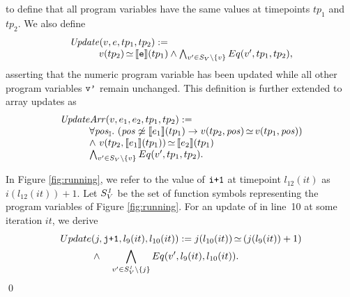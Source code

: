 to define that all program variables have the same values at
timepoints $tp_1$ and $tp_2$. We also define
%
\begin{equation*}
\begin{array}{l}
\mathit{Update}(v,e,tp_1,tp_2) := \\
\qquad\quad	 v(tp_2) {\,\simeq\,} \llbracket \texttt{e} \rrbracket(tp_1) 
\land \bigwedge_{v' \in S_V \setminus \{v\}} Eq(v',tp_1,tp_2), 
\end{array}
\end{equation*}
asserting that the numeric program variable  has been updated while
all other program variables $\texttt{v'}$ remain unchanged. This definition is
further 
extended  to array updates as
\begin{equation*}
\begin{array}{l}
\mathit{Update}\mathit{Arr}(v,e_1,e_2,tp_1,tp_2) :=\\
\qquad\quad \forall \mathit{pos}_{\mathbb{I}}. \ (\mathit{pos} \not\simeq \llbracket e_1\rrbracket(tp_1) \rightarrow 
v(tp_2, \mathit{pos}) {\,\simeq\,} v(tp_1, \mathit{pos}))
\\
\qquad\quad \land \ v(tp_2, \llbracket e_1 \rrbracket(tp_1)) {\,\simeq\,} \llbracket e_2 \rrbracket(tp_1) 	\\
\qquad\quad  \bigwedge_{v' \in S_V \setminus \{v\}} Eq(v',tp_1,tp_2). 	\nonumber 
\end{array}
\end{equation*}

\begin{example}
	In Figure \ref{fig:running}, we refer to the value of $\texttt{i+1}$ at timepoint $l_{12}(it)$ as
	$i(l_{12}(it))+1$. 
	Let $S_V^\textit{1}$ be the set of function symbols
	representing the program variables of Figure \ref{fig:running}.
	For an update of  in line~10 at some iteration $it$, we derive 
	\begin{align*}
	Update&(j, \texttt{j+1}, l_9(it), l_{10}(it))  :=  j(l_{10}(it)) {\,\simeq\,} (j(l_9(it))+1) 
	\\& \land  \quad \bigwedge_{v' \in S_V^\textit{1} \setminus \{j\}} Eq(v', l_9(it), l_{10}(it)). 
	\end{align*}\qed
\end{example}

